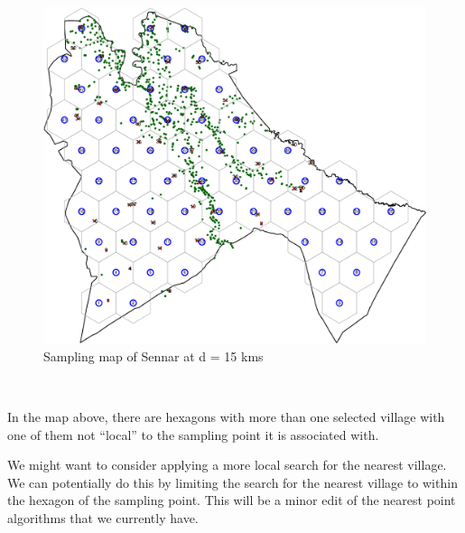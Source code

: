 \documentclass[11pt,a4paper]{article}
\begin{document}
\begin{figure}[h]

{\centering \includegraphics{notesS3Mtri_files/figure-latex/unnamed-chunk-17-1} 

}

\caption{Sampling map of Sennar at d = 15 kms}\label{fig:unnamed-chunk-17}
\end{figure}

~

In the map above, there are hexagons with more than one selected village
with one of them not ``local'' to the sampling point it is associated
with.

We might want to consider applying a more local search for the nearest
village. We can potentially do this by limiting the search for the
nearest village to within the hexagon of the sampling point. This will
be a minor edit of the nearest point algorithms that we currently have.
\end{document}
